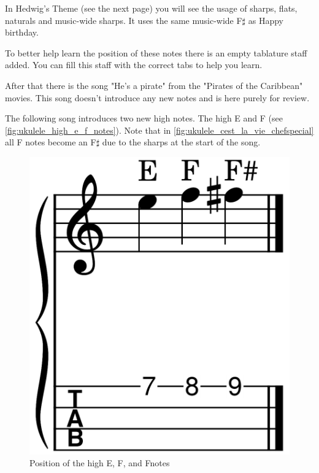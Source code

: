 In Hedwig's Theme (see the next page) you will see the usage of sharps, flats, naturals and music-wide sharps. It uses the same music-wide F$\sharp$ as Happy birthday.

To better help learn the position of these notes there is an empty tablature staff added. You can fill this staff with the correct tabs to help you learn.

After that there is the song "He's a pirate" from the "Pirates of the Caribbean" movies. This song doesn't introduce any new notes and is here purely for review.





The following song introduces two new high notes. The high E and F (see \autoref{fig:ukulele_high_e_f_notes}). Note that in \autoref{fig:ukulele_cest_la_vie_chefspecial} all F notes become an F$\sharp$ due to the sharps at the start of the song.

\begin{figure}[h]
	\centering
	\includegraphics[height=0.12\textheight]{../../MuseScore/Ukulele/UkuleleHighEF.png}
	\caption{Position of the high E, F, and F\sharp notes}
	\label{fig:ukulele_high_e_f_notes}
\end{figure}

